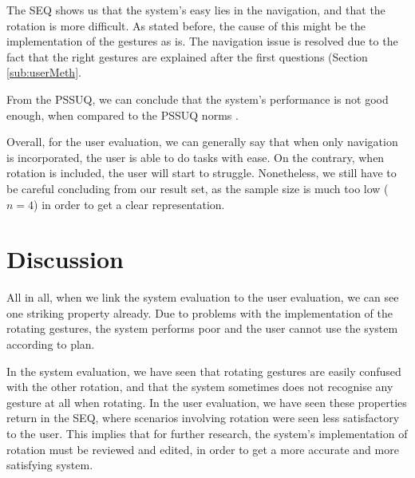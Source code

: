 \documentclass[11pt,a4paper]{article}
\begin{document}
The SEQ shows us that the system's easy lies in the navigation, and that the rotation is more difficult. As stated before, the cause of this might be the implementation of the gestures as is. The navigation issue is resolved due to the fact that the right gestures are explained after the first questions (Section \ref{sub:userMeth}.

From the PSSUQ, we can conclude that the system's performance is not good enough, when compared to the PSSUQ norms \cite{sauro2012quantifying}. 

Overall, for the user evaluation, we can generally say that when only navigation is incorporated, the user is able to do tasks with ease. On the contrary, when rotation is included, the user will start to struggle. Nonetheless, we still have to be careful concluding from our result set, as the sample size is much too low ($n=4$) in order to get a clear representation.  

\section{Discussion}
All in all, when we link the system evaluation to the user evaluation, we can see one striking property already. Due to problems with the implementation of the rotating gestures, the system performs poor and the user cannot use the system according to plan. 

In the system evaluation, we have seen that rotating gestures are easily confused with the other rotation, and that the system sometimes does not recognise any gesture at all when rotating. In the user evaluation, we have seen these properties return in the SEQ, where scenarios involving rotation were seen less satisfactory to the user.
This implies that for further research, the system's implementation of rotation must be reviewed and edited, in order to get a more accurate and more satisfying system.


{}

\end{document}
